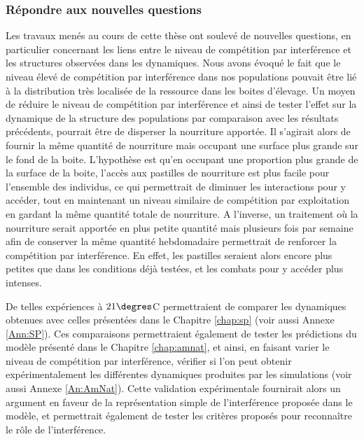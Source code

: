 \subsubsection{Répondre aux nouvelles questions}

Les travaux menés au cours de cette thèse ont soulevé de nouvelles questions,
en particulier concernant les liens entre le niveau de compétition par
interférence et les structures observées dans les dynamiques. Nous avons évoqué le fait que
le niveau élevé de compétition par interférence dans nos populations pouvait
être lié à la distribution très localisée de la ressource dans les boites
d'élevage. Un moyen de réduire le niveau de compétition par interférence et
ainsi de tester l'effet sur la dynamique de la structure des populations par
comparaison avec les résultats précédents, pourrait être de disperser la
nourriture apportée. Il s'agirait alors de fournir la même quantité de
nourriture mais occupant une surface plus grande sur le fond de la boite.
L'hypothèse est qu'en occupant une proportion plus grande de la surface de
la boite, l'accès aux pastilles de nourriture est plus facile pour l'ensemble
des individus, ce qui permettrait de diminuer les interactions pour y accéder,
tout en maintenant un niveau similaire de compétition par exploitation en
gardant la même quantité totale de nourriture. A l'inverse, un traitement où la
nourriture serait apportée en plus petite quantité mais plusieurs fois par
semaine afin de conserver la même quantité hebdomadaire permettrait de renforcer
la compétition par interférence. En effet, les pastilles seraient alors encore
plus petites que dans les conditions déjà testées, et les combats pour y accéder
plus intenses.

De telles expériences à $21\degres$C permettraient de comparer les dynamiques
obtenues avec celles présentées dans le Chapitre \ref{chap:sp} (voir aussi
Annexe \ref{Ann:SP}). Ces comparaisons permettraient également de tester les
prédictions du modèle présenté dans le Chapitre \ref{chap:amnat}, et ainsi, en
faisant varier le niveau de compétition par interférence, vérifier si l'on peut
obtenir expérimentalement les différentes dynamiques produites par les
simulations (voir aussi Annexe \ref{An:AmNat}).
Cette validation expérimentale fournirait alors un argument en faveur de la
représentation simple de l'interférence proposée dans le modèle, et permettrait
également de tester les critères proposés pour reconnaître le rôle de
l'interférence.

